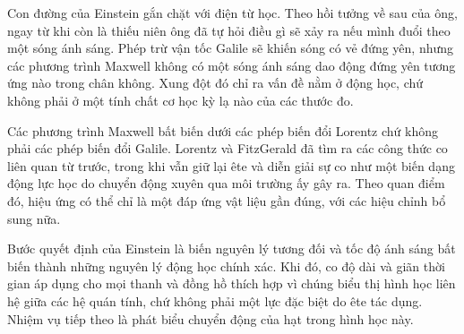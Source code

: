\begin{classroomqa}
\end{classroomqa}

Con đường của Einstein gắn chặt với điện từ học. Theo hồi tưởng về sau của ông, ngay từ khi còn là thiếu niên ông đã tự hỏi điều gì sẽ xảy ra nếu mình đuổi theo một sóng ánh sáng. Phép trừ vận tốc Galile sẽ khiến sóng có vẻ đứng yên, nhưng các phương trình Maxwell không có một sóng ánh sáng dao động đứng yên tương ứng nào trong chân không. Xung đột đó chỉ ra vấn đề nằm ở động học, chứ không phải ở một tính chất cơ học kỳ lạ nào của các thước đo.

\begin{classroomqa}
\end{classroomqa}

Các phương trình Maxwell bất biến dưới các phép biến đổi Lorentz chứ không phải các phép biến đổi Galile. Lorentz và FitzGerald đã tìm ra các công thức co liên quan từ trước, trong khi vẫn giữ lại ête và diễn giải sự co như một biến dạng động lực học do chuyển động xuyên qua môi trường ấy gây ra. Theo quan điểm đó, hiệu ứng có thể chỉ là một đáp ứng vật liệu gần đúng, với các hiệu chỉnh bổ sung nữa.

Bước quyết định của Einstein là biến nguyên lý tương đối và tốc độ ánh sáng bất biến thành những nguyên lý động học chính xác. Khi đó, co độ dài và giãn thời gian áp dụng cho mọi thanh và đồng hồ thích hợp vì chúng biểu thị hình học liên hệ giữa các hệ quán tính, chứ không phải một lực đặc biệt do ête tác dụng. Nhiệm vụ tiếp theo là phát biểu chuyển động của hạt trong hình học này.
